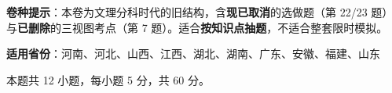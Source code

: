 

\begin{gknotice}
\textbf{ 卷种提示}：本卷为文理分科时代的旧结构，含\textbf{现已取消}的选做题（第 22/23 题）与\textbf{已删除}的三视图考点（第 7 题）。适合\textbf{按知识点抽题}，不适合整套限时模拟。

\textbf{适用省份}：河南、河北、山西、江西、湖北、湖南、广东、安徽、福建、山东
\end{gknotice}

\par\medskip


\begin{gktip}
本题共 12 小题，每小题 5 分，共 60 分。
\end{gktip}

